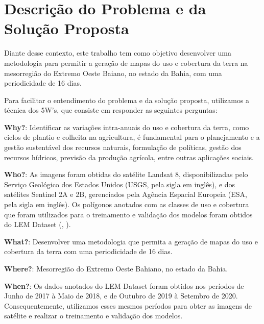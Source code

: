 \chapter{Descrição do Problema e da Solução Proposta}

Diante desse contexto, este trabalho tem como objetivo desenvolver uma metodologia para permitir a geração de mapas do uso e cobertura da terra na mesorregião do Extremo Oeste Baiano, no estado da Bahia, com uma periodicidade de 16 dias. 

Para facilitar o entendimento do problema e da solução proposta, utilizamos a técnica dos 5W's, que consiste em responder as seguintes perguntas:

\textbf{Why?}: Identificar as variações intra-anuais do uso e cobertura da terra, como ciclos de plantio e colheita na agricultura, é fundamental para o planejamento e a gestão sustentável dos recursos naturais, formulação de políticas, gestão dos recursos hídricos, previsão da produção agrícola, entre outras aplicações sociais.

\textbf{Who?}: As imagens foram obtidas do satélite Landsat 8, disponibilizadas pelo Serviço Geológico dos Estados Unidos (USGS, pela sigla em inglês), e dos satélites Sentinel 2A e 2B, gerenciados pela Agência Espacial Europeia (ESA, pela sigla em inglês). Os polígonos anotados com as classes de uso e cobertura que foram utilizados para o treinamento e validação dos modelos foram obtidos do LEM Dataset (, ). 

\textbf{What?}: Desenvolver uma metodologia que permita a geração de mapas do uso e cobertura da terra com uma periodicidade de 16 dias.

\textbf{Where?}: Mesorregião do Extremo Oeste Bahiano, no estado da Bahia.  

\textbf{When?}: Os dados anotados do LEM Dataset foram obtidos nos períodos de Junho de 2017 à Maio de 2018, e de Outubro de 2019 à Setembro de 2020. Consequentemente, utilizamos esses mesmos períodos para obter as imagens de satélite e realizar o treinamento e validação dos modelos.  


\renewcommand{\cleardoublepage}{}
\renewcommand{\clearpage}{}
\vspace{5mm}